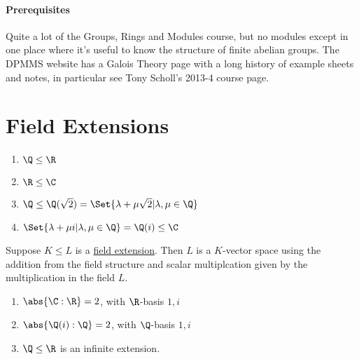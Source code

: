 \documentclass{article}
\begin{document}
\paragraph{Prerequisites} Quite a lot of the Groups, Rings and Modules course, but no modules except in one place where it's useful to know the structure of finite abelian groups. The DPMMS website has a Galois Theory page with a long history of example sheets and notes, in particular see Tony Scholl's 2013-4 course page.
\clearpage

\section{Field Extensions}

\begin{eg}
    \leavevmode
    \begin{enumerate}[label=(\roman*)]
        \item $\Q \leq \R$
        \item $\R \leq \C$
        \item $\Q \leq \Q(\sqrt{2}) = \Set{\lambda + \mu \sqrt{2} | \lambda, \mu \in \Q}$
        \item $\Set{\lambda + \mu i | \lambda, \mu \in \Q} = \Q(i) \leq \C$
    \end{enumerate}
\end{eg}

Suppose $K \leq L$ is a \hyperlink{def:fieldExt}{field extension}. Then $L$ is a $K$-vector space using the addition from the field structure and scalar multiplcation given by the multiplication in the field $L$.


\begin{eg}\leavevmode
    \begin{enumerate}[label=(\roman*)]
        \item $\abs{\C:\R} = 2$, with $\R$-basis $1, i$
        \item $\abs{\Q(i):\Q} = 2$, with $\Q$-basis $1, i$
        \item $\Q \leq \R$ is an infinite extension.
    \end{enumerate}
\end{eg}
\end{document}
